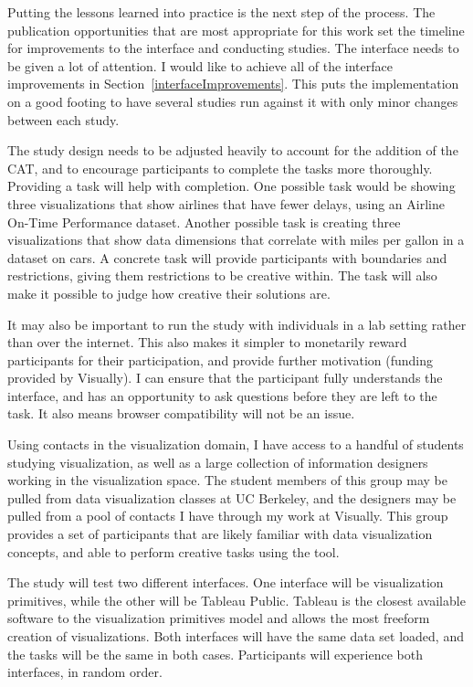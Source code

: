 \label{futureWork}

Putting the lessons learned into practice is the next step of the process.
The publication opportunities that are most appropriate for this work set the timeline for improvements to the interface and conducting studies.
The interface needs to be given a lot of attention.
I would like to achieve all of the interface improvements in Section~\ref{interfaceImprovements}.
This puts the implementation on a good footing to have several studies run against it with only minor changes between each study.

The study design needs to be adjusted heavily to account for the addition of the CAT, and to encourage participants to complete the tasks more thoroughly.
Providing a task will help with completion.
One possible task would be showing three visualizations that show airlines that have fewer delays, using an Airline On-Time Performance dataset.
Another possible task is creating three visualizations that show data dimensions that correlate with miles per gallon in a dataset on cars.
A concrete task will provide participants with boundaries and restrictions, giving them restrictions to be creative within.
The task will also make it possible to judge how creative their solutions are.

It may also be important to run the study with individuals in a lab setting rather than over the internet.
This also makes it simpler to monetarily reward participants for their participation, and provide further motivation (funding provided by Visually).
I can ensure that the participant fully understands the interface, and has an opportunity to ask questions before they are left to the task.
It also means browser compatibility will not be an issue.

Using contacts in the visualization domain, I have access to a handful of students studying visualization, as well as a large collection of information designers working in the visualization space.
The student members of this group may be pulled from data visualization classes at UC Berkeley, and the designers may be pulled from a pool of contacts I have through my work at Visually.
This group provides a set of participants that are likely familiar with data visualization concepts, and able to perform creative tasks using the tool.

The study will test two different interfaces.
One interface will be visualization primitives, while the other will be Tableau Public.
Tableau is the closest available software to the visualization primitives model and allows the most freeform creation of visualizations.
Both interfaces will have the same data set loaded, and the tasks will be the same in both cases.
Participants will experience both interfaces, in random order.

